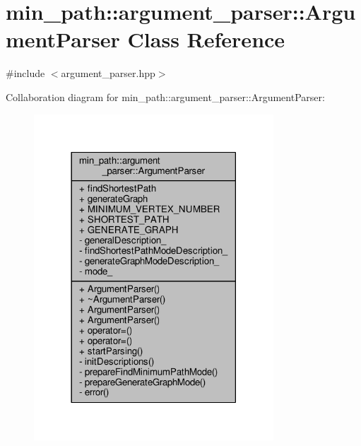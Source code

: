 \hypertarget{a00002}{}\section{min\+\_\+path\+:\+:argument\+\_\+parser\+:\+:Argument\+Parser Class Reference}
\label{a00002}


{\ttfamily \#include $<$argument\+\_\+parser.\+hpp$>$}



Collaboration diagram for min\+\_\+path\+:\+:argument\+\_\+parser\+:\+:Argument\+Parser\+:
\nopagebreak
\begin{figure}[H]
\begin{center}
\leavevmode
\includegraphics[width=254pt]{da/d24/a00068}
\end{center}
\end{figure}
